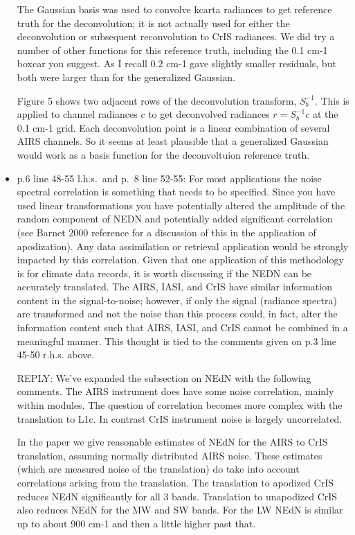 \documentclass[11pt]{article}
\newcommand {\reply} {\mbox{\small REPLY}}
\begin{document}
\begin{itemize}
  The Gaussian basis was used to convolve kcarta radiances to get
  reference truth for the deconvolution; it is not actually used 
  for either the deconvolution or subsequent reconvolution to CrIS
  radiances.  We did try a number of other functions for this
  reference truth, including the 0.1 cm-1 boxcar you suggest.  As I
  recall 0.2 cm-1 gave slightly smaller residuals, but both were
  larger than for the generalized Gaussian.

  Figure 5 shows two adjacent rows of the deconvolution transform,
  $S_b^{-1}$.  This is applied to channel radiances $c$ to get
  deconvolved radiances $r = S_b^{-1} c$ at the 0.1 cm-1 grid.  
  Each deconvolution point is a linear combination of several AIRS
  channels.  So it seems at least plausible that a generalized
  Gaussian would work as a basis function for the deconvoltuion
  reference truth.


\item p.6 line 48-55 l.h.s.~and p.~8 line 52-55: For most
  applications the noise spectral correlation is something that
  needs to be specified.  Since you have used linear transformations
  you have potentially altered the amplitude of the random component
  of NEDN and potentially added significant correlation (see Barnet
  2000 reference for a discussion of this in the application of
  apodization). Any data assimilation or retrieval application would
  be strongly impacted by this correlation. Given that one
  application of this methodology is for climate data records, it is
  worth discussing if the NEDN can be accurately translated.  The
  AIRS, IASI, and CrIS have similar information content in the
  signal-to-noise; however, if only the signal (radiance spectra)
  are transformed and not the noise than this process could, in
  fact, alter the information content such that AIRS, IASI, and CrIS
  cannot be combined in a meaningful manner. This thought is tied to
  the comments given on p.3 line 45-50 r.h.s. above.

  \reply: We've expanded the subsection on NEdN with the following
  comments.  The AIRS instrument does have some noise correlation,
  mainly within modules.  The question of correlation becomes more
  complex with the translation to L1c.  In contrast CrIS instrument
  noise is largely uncorrelated.

  In the paper we give reasonable estimates of NEdN for the AIRS to
  CrIS translation, assuming normally distributed AIRS noise.  These
  estimates (which are measured noise of the translation) do take
  into account correlations arising from the translation.  The
  translation to apodized CrIS reduces NEdN significantly for all 3
  bands.  Translation to unapodized CrIS also reduces NEdN for the
  MW and SW bands.  For the LW NEdN is similar up to about 900 cm-1
  and then a little higher past that.


\end{itemize}
\end{document}
